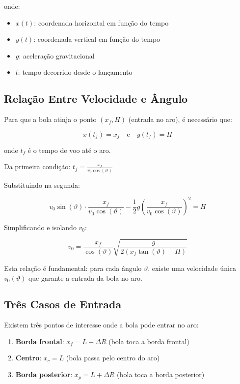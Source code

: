 \documentclass[12pt,a4paper]{article}
\begin{document}
onde:
\begin{itemize}
    \item $x(t)$: coordenada horizontal em função do tempo
    \item $y(t)$: coordenada vertical em função do tempo
    \item $g$: aceleração gravitacional
    \item $t$: tempo decorrido desde o lançamento
\end{itemize}

\subsection{Relação Entre Velocidade e Ângulo}

Para que a bola atinja o ponto $(x_f, H)$ (entrada no aro), é necessário que:

\begin{equation}
x(t_f) = x_f \quad \text{e} \quad y(t_f) = H
\end{equation}

onde $t_f$ é o tempo de voo até o aro.

Da primeira condição: $t_f = \frac{x_f}{v_0 \cos(\vartheta)}$

Substituindo na segunda:

\begin{equation}
v_0 \sin(\vartheta) \cdot \frac{x_f}{v_0 \cos(\vartheta)} - \frac{1}{2}g\left(\frac{x_f}{v_0 \cos(\vartheta)}\right)^2 = H
\end{equation}

Simplificando e isolando $v_0$:

\begin{equation}
v_0 = \frac{x_f}{\cos(\vartheta)}\sqrt{\frac{g}{2(x_f \tan(\vartheta) - H)}}
\end{equation}

Esta relação é fundamental: para cada ângulo $\vartheta$, existe uma velocidade única $v_0(\vartheta)$ que garante a entrada da bola no aro.

\subsection{Três Casos de Entrada}

Existem três pontos de interesse onde a bola pode entrar no aro:

\begin{enumerate}
    \item \textbf{Borda frontal}: $x_f = L - \Delta R$ (bola toca a borda frontal)
    \item \textbf{Centro}: $x_c = L$ (bola passa pelo centro do aro)
    \item \textbf{Borda posterior}: $x_p = L + \Delta R$ (bola toca a borda posterior)
\end{enumerate}
\end{document}
